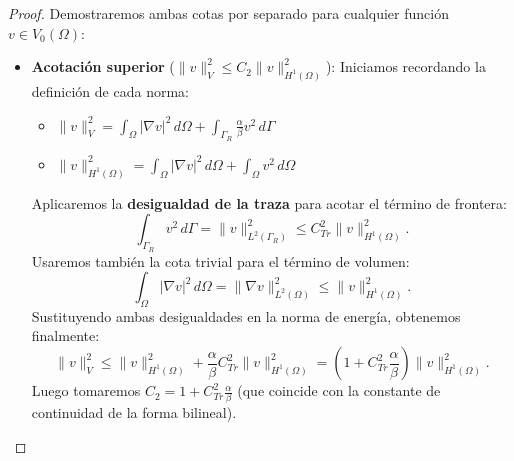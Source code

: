 \documentclass[11pt]{book}
\theoremstyle{plain} %
\theoremstyle{definition} %
\theoremstyle{definition} %
\begin{document}
\begin{proof}
Demostraremos ambas cotas por separado para cualquier función $v \in V_0(\Omega)$:

    \begin{itemize}
        \item \textbf{Acotación superior} ($\|v\|_{V}^2 \leq C_2 \|v\|_{H^1(\Omega)}^2$): Iniciamos recordando la definición de cada norma:
        \begin{itemize} 
            \item $\|v\|_{V}^2 = \int_{\Omega} |\nabla v|^2 \, d\Omega + \int_{\Gamma_R} \frac{\alpha}{\beta} v^2 \, d\Gamma$
            \item $\|v\|_{H^1(\Omega)}^2 = \int_{\Omega} |\nabla v|^2 \, d\Omega + \int_{\Omega} v^2 \, d\Omega$
        \end{itemize}

        Aplicaremos la \textbf{desigualdad de la traza} para acotar el término de frontera:
        \begin{equation*}
            \int_{\Gamma_R} v^2 \, d\Gamma = \|v\|_{L^2(\Gamma_R)}^2 \leq C_{Tr}^2 \|v\|_{H^1(\Omega)}^2.
        \end{equation*}
        Usaremos también la cota trivial para el término de volumen:
        \begin{equation*}
            \int_{\Omega} |\nabla v|^2 \, d\Omega = \|\nabla v\|_{L^2(\Omega)}^2 \leq \|v\|_{H^1(\Omega)}^2.
        \end{equation*}
        Sustituyendo ambas desigualdades en la norma de energía, obtenemos finalmente:
        \begin{equation*}
            \|v\|_{V}^2 \leq \|v\|_{H^1(\Omega)}^2 + \frac{\alpha}{\beta} C_{Tr}^2 \|v\|_{H^1(\Omega)}^2 = \left(1 + C_{Tr}^2 \frac{\alpha}{\beta}\right) \|v\|_{H^1(\Omega)}^2.
        \end{equation*}
        Luego tomaremos $C_2 = 1 + C_{Tr}^2 \frac{\alpha}{\beta}$ (que coincide con la constante de continuidad de la forma bilineal).


\end{itemize}
\end{proof}
\end{document}

